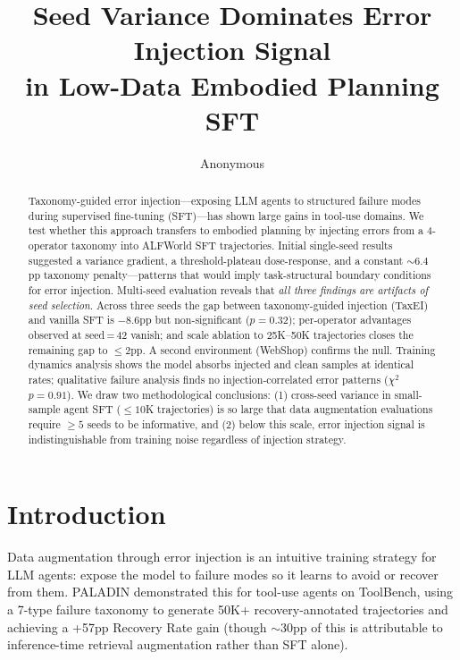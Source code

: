 \documentclass[11pt,a4paper]{article}
\title{Seed Variance Dominates Error Injection Signal\\in Low-Data Embodied Planning SFT}
\author{Anonymous}
\date{}
\begin{document}
\maketitle

\begin{abstract}
Taxonomy-guided error injection---exposing LLM agents to structured failure modes during supervised fine-tuning (SFT)---has shown large gains in tool-use domains.
We test whether this approach transfers to embodied planning by injecting errors from a 4-operator taxonomy into ALFWorld SFT trajectories.
Initial single-seed results suggested a variance gradient, a threshold-plateau dose-response, and a constant ${\sim}6.4$pp taxonomy penalty---patterns that would imply task-structural boundary conditions for error injection.
Multi-seed evaluation reveals that \emph{all three findings are artifacts of seed selection}.
Across three seeds the gap between taxonomy-guided injection (TaxEI) and vanilla SFT is $-8.6$pp but non-significant ($p{=}0.32$); per-operator advantages observed at seed\,=\,42 vanish; and scale ablation to 25K--50K trajectories closes the remaining gap to ${\leq}2$pp.
A second environment (WebShop) confirms the null.
Training dynamics analysis shows the model absorbs injected and clean samples at identical rates; qualitative failure analysis finds no injection-correlated error patterns ($\chi^2$ $p{=}0.91$).
We draw two methodological conclusions: (1) cross-seed variance in small-sample agent SFT (${\leq}10$K trajectories) is so large that data augmentation evaluations require ${\geq}5$ seeds to be informative, and (2) below this scale, error injection signal is indistinguishable from training noise regardless of injection strategy.
\end{abstract}

\section{Introduction}

Data augmentation through error injection is an intuitive training strategy for LLM agents: expose the model to failure modes so it learns to avoid or recover from them.
PALADIN \cite{paladin2025} demonstrated this for tool-use agents on ToolBench, using a 7-type failure taxonomy to generate 50K+ recovery-annotated trajectories and achieving a +57pp Recovery Rate gain (though ${\sim}30$pp of this is attributable to inference-time retrieval augmentation rather than SFT alone).
\end{document}
